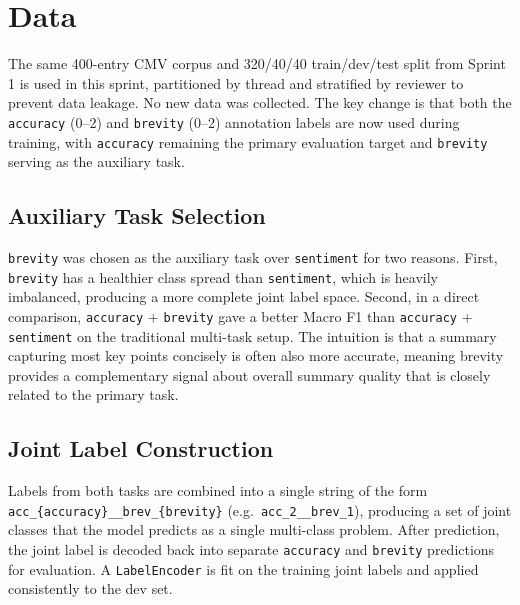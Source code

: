 \documentclass[11pt,twocolumn]{article}
\begin{document}
\section{Data}

The same 400-entry CMV corpus and 320/40/40 train/dev/test split from Sprint 1
is used in this sprint, partitioned by thread and stratified by reviewer to
prevent data leakage. No new data was collected. The key change is that both
the \texttt{accuracy} (0--2) and \texttt{brevity} (0--2) annotation labels are
now used during training, with \texttt{accuracy} remaining the primary
evaluation target and \texttt{brevity} serving as the auxiliary task.

\subsection{Auxiliary Task Selection}

\texttt{brevity} was chosen as the auxiliary task over \texttt{sentiment} for
two reasons. First, \texttt{brevity} has a healthier class spread than
\texttt{sentiment}, which is heavily imbalanced, producing a more complete
joint label space. Second, in a direct comparison, \texttt{accuracy} +
\texttt{brevity} gave a better Macro F1 than \texttt{accuracy} +
\texttt{sentiment} on the traditional multi-task setup. The intuition is that a
summary capturing most key points concisely is often also more accurate, meaning
brevity provides a complementary signal about overall summary quality that is
closely related to the primary task.

\subsection{Joint Label Construction}

Labels from both tasks are combined into a single string of the form
\texttt{acc\_\{accuracy\}\_\_brev\_\{brevity\}} (e.g.\ \texttt{acc\_2\_\_brev\_1}),
producing a set of joint classes that the model predicts as a single multi-class
problem. After prediction, the joint label is decoded back into separate
\texttt{accuracy} and \texttt{brevity} predictions for evaluation. A
\texttt{LabelEncoder} is fit on the training joint labels and applied
consistently to the dev set.

\end{document}
